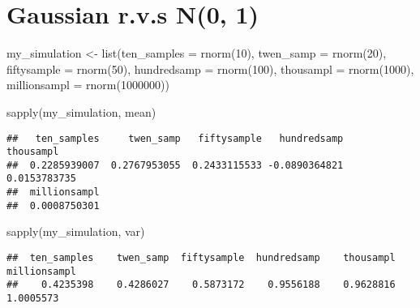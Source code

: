 \documentclass[
]{article}
\newenvironment{Shaded}{\begin{snugshade}}{\end{snugshade}}
\newcommand{\AttributeTok}[1]{\textcolor[rgb]{0.77,0.63,0.00}{#1}}
\newcommand{\DecValTok}[1]{\textcolor[rgb]{0.00,0.00,0.81}{#1}}
\newcommand{\FunctionTok}[1]{\textcolor[rgb]{0.00,0.00,0.00}{#1}}
\newcommand{\NormalTok}[1]{#1}
\newcommand{\OtherTok}[1]{\textcolor[rgb]{0.56,0.35,0.01}{#1}}
\begin{document}
\hypertarget{gaussian-r.v.s-n0-1}{%
\section{Gaussian r.v.s N(0, 1)}\label{gaussian-r.v.s-n0-1}}

\begin{Shaded}
\begin{Highlighting}[]
\NormalTok{my\_simulation }\OtherTok{\textless{}{-}} \FunctionTok{list}\NormalTok{(}\AttributeTok{ten\_samples =} \FunctionTok{rnorm}\NormalTok{(}\DecValTok{10}\NormalTok{),}
                      \AttributeTok{twen\_samp =} \FunctionTok{rnorm}\NormalTok{(}\DecValTok{20}\NormalTok{), }
                      \AttributeTok{fiftysample =} \FunctionTok{rnorm}\NormalTok{(}\DecValTok{50}\NormalTok{),}
                      \AttributeTok{hundredsamp =} \FunctionTok{rnorm}\NormalTok{(}\DecValTok{100}\NormalTok{), }
                      \AttributeTok{thousampl =} \FunctionTok{rnorm}\NormalTok{(}\DecValTok{1000}\NormalTok{),}
                      \AttributeTok{millionsampl =} \FunctionTok{rnorm}\NormalTok{(}\DecValTok{1000000}\NormalTok{))}

\FunctionTok{sapply}\NormalTok{(my\_simulation, mean)}
\end{Highlighting}
\end{Shaded}

\begin{verbatim}
##   ten_samples     twen_samp   fiftysample   hundredsamp     thousampl 
##  0.2285939007  0.2767953055  0.2433115533 -0.0890364821  0.0153783735 
##  millionsampl 
##  0.0008750301
\end{verbatim}

\begin{Shaded}
\begin{Highlighting}[]
\FunctionTok{sapply}\NormalTok{(my\_simulation, var)}
\end{Highlighting}
\end{Shaded}

\begin{verbatim}
##  ten_samples    twen_samp  fiftysample  hundredsamp    thousampl millionsampl 
##    0.4235398    0.4286027    0.5873172    0.9556188    0.9628816    1.0005573
\end{verbatim}
\end{document}
